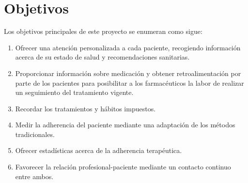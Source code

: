 \section{Objetivos}
Los objetivos principales de este proyecto se enumeran como sigue:
\begin{enumerate}
	\item Ofrecer una atención personalizada a cada paciente, recogiendo información acerca de su estado de salud y recomendaciones sanitarias.
	
	\item Proporcionar información sobre medicación y obtener retroalimentación por parte de los pacientes para posibilitar a los farmacéuticos la labor de realizar un seguimiento del tratamiento vigente.
	
	\item Recordar los tratamientos y hábitos impuestos.
	
	\item Medir la adherencia del paciente mediante una adaptación de los métodos tradicionales.
	
	\item Ofrecer estadísticas acerca de la adherencia terapéutica.
	
	\item Favorecer la relación profesional-paciente mediante un contacto continuo entre ambos.
\end{enumerate}
	


